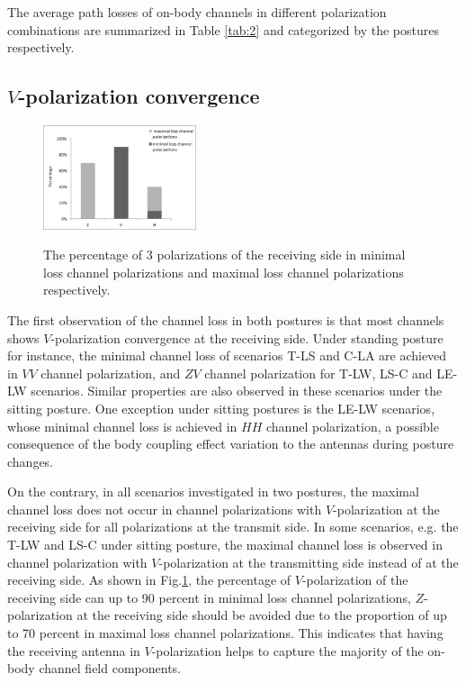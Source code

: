 \documentclass[conference]{IEEEtran}
\begin{document}
The average path losses of on-body channels in different polarization combinations are summarized in Table \ref{tab:2} and categorized by the postures respectively.

\subsection{$V$-polarization convergence}

\begin{figure}[!t]
  \centering
  \includegraphics[width=0.4\textwidth]{figs/6.eps}\\
  \caption{The percentage of 3 polarizations of the receiving side in minimal loss channel polarizations and maximal loss channel polarizations respectively.}
  \label{fig:polarization percentage}
\end{figure}

The first observation of the channel loss in both postures is that most channels shows $V$-polarization convergence at the receiving side. Under standing posture for instance, the minimal channel loss of scenarios T-LS and C-LA are achieved in $VV$ channel polarization, and $ZV$ channel polarization for T-LW, LS-C and LE-LW scenarios. Similar properties are also observed in these scenarios under the sitting posture. One exception under sitting postures is the LE-LW scenarios, whose minimal channel loss is achieved in $HH$ channel polarization, a possible consequence of the body coupling effect variation to the antennas during posture changes.

On the contrary, in all scenarios investigated in two postures, the maximal channel loss does not occur in channel polarizations with $V$-polarization at the receiving side for all polarizations at the transmit side.  In some scenarios, e.g. the T-LW and LS-C under sitting posture, the maximal channel loss is observed in channel polarization with $V$-polarization at the transmitting side instead of at the receiving side. As shown in Fig.\ref{fig:polarization percentage}, the percentage of $V$-polarization of the receiving side can up to 90 percent in minimal loss channel polarizations, $Z$-polarization at the receiving side should be avoided due to the proportion of up to 70 percent in maximal loss channel polarizations. This indicates that having the receiving antenna in $V$-polarization helps to capture the majority of the on-body channel field components.
\end{document}
